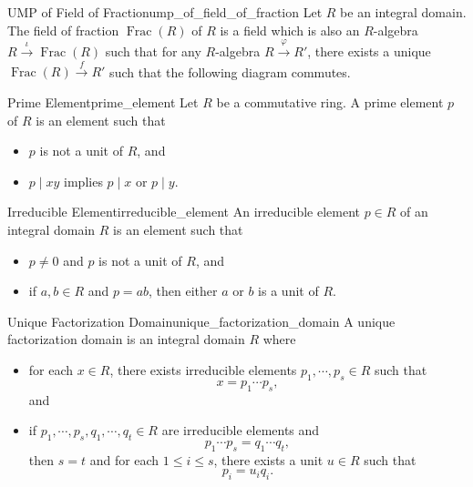 \documentclass{article}
\begin{document}
\begin{proposition}{UMP of Field of Fraction}{ump_of_field_of_fraction}
    Let $R$ be an integral domain.
    The field of fraction $\operatorname{Frac}(R)$ of $R$ is a field which is also an $R$-algebra $R\xrightarrow{\iota} \operatorname{Frac}(R)$ such that for any $R$-algebra $R\xrightarrow{\varphi} R'$, there exists a unique $\operatorname{Frac}(R) \xrightarrow{f} R'$ such that the following diagram commutes.
    \begin{center}
    \end{center}
\end{proposition}

\begin{definition}{Prime Element}{prime_element}
    Let $R$ be a commutative ring.
    A prime element $p$ of $R$ is an element such that
    \begin{itemize}
        \item $p$ is not a unit of $R$, and
        \item $p \mid xy$ implies $p \mid x$ or $p \mid y$.
    \end{itemize}
\end{definition}

\begin{definition}{Irreducible Element}{irreducible_element}
    An irreducible element $p\in R$ of an integral domain $R$ is an element such that
    \begin{itemize}
        \item $p\neq 0$ and $p$ is not a unit of $R$, and
        \item if $a,b\in R$ and $p=ab$, then either $a$ or $b$ is a unit of $R$.
    \end{itemize}
\end{definition}

\begin{definition}{Unique Factorization Domain}{unique_factorization_domain}
    A unique factorization domain is an integral domain $R$ where
    \begin{itemize}
        \item for each $x\in R$, there exists irreducible elements $p_1,\cdots,p_s\in R$ such that
        \[ x = p_1\cdots p_s, \]
        and
        \item if $p_1,\cdots,p_s,q_1,\cdots,q_t\in R$ are irreducible elements and
        \[ p_1\cdots p_s = q_1 \cdots q_t, \]
        then $s = t$ and for each $1\le i \le s$, there exists a unit $u\in R$ such that
        \[ p_i = u_i q_i. \]
    \end{itemize}
\end{definition}
\end{document}
